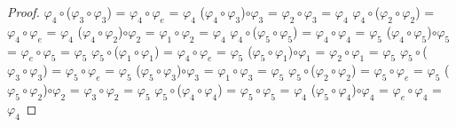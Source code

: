 \documentclass[10pt,a4paper,oneside]{article}
\begin{document}
\begin{proof}
					\newline
					\newline
					$\varphi_{4}\circ$($\varphi_{3}\circ\varphi_{3}$) = $\varphi_{4}\circ\varphi_{e}$ = $\varphi_{4}$
					\newline
					($\varphi_{4}\circ\varphi_{3}$)$\circ\varphi_{3}$ = $\varphi_{2}\circ\varphi_{3}$ = $\varphi_{4}$
					\newline
					\newline
					$\varphi_{4}\circ$($\varphi_{2}\circ\varphi_{2}$) = $\varphi_{4}\circ\varphi_{e}$ = $\varphi_{4}$
					\newline
					($\varphi_{4}\circ\varphi_{2}$)$\circ\varphi_{2}$ = $\varphi_{1}\circ\varphi_{2}$ = $\varphi_{4}$
					\newline
					\newline
					$\varphi_{4}\circ$($\varphi_{5}\circ\varphi_{5}$) = $\varphi_{4}\circ\varphi_{4}$ = $\varphi_{5}$
					\newline
					($\varphi_{4}\circ\varphi_{5}$)$\circ\varphi_{5}$ = $\varphi_{e}\circ\varphi_{5}$ = $\varphi_{5}$
					\newline
					\newline
					$\varphi_{5}\circ$($\varphi_{1}\circ\varphi_{1}$) = $\varphi_{4}\circ\varphi_{e}$ = $\varphi_{5}$
					\newline
					($\varphi_{5}\circ\varphi_{1}$)$\circ\varphi_{1}$ = $\varphi_{2}\circ\varphi_{1}$ = $\varphi_{5}$
					\newline
					\newline
					$\varphi_{5}\circ$($\varphi_{3}\circ\varphi_{3}$) = $\varphi_{5}\circ\varphi_{e}$ = $\varphi_{5}$
					\newline
					($\varphi_{5}\circ\varphi_{3}$)$\circ\varphi_{3}$ = $\varphi_{1}\circ\varphi_{3}$ = $\varphi_{5}$
					\newline
					\newline
					$\varphi_{5}\circ$($\varphi_{2}\circ\varphi_{2}$) = $\varphi_{5}\circ\varphi_{e}$ = $\varphi_{5}$
					\newline
					($\varphi_{5}\circ\varphi_{2}$)$\circ\varphi_{2}$ = $\varphi_{3}\circ\varphi_{2}$ = $\varphi_{5}$
					\newline
					\newline
					$\varphi_{5}\circ$($\varphi_{4}\circ\varphi_{4}$) = $\varphi_{5}\circ\varphi_{5}$ = $\varphi_{4}$
					\newline
					($\varphi_{5}\circ\varphi_{4}$)$\circ\varphi_{4}$ = $\varphi_{e}\circ\varphi_{4}$ = $\varphi_{4}$
					\newline

\end{proof}
\end{document}
